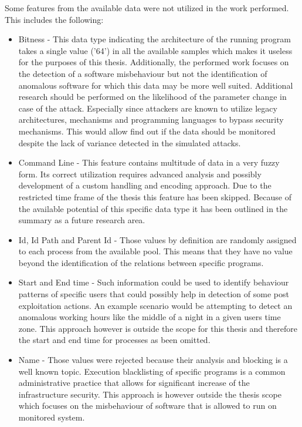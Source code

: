 \documentclass[a4paper,twoside,12pt]{book}
\begin{document}
Some features from the available data were not utilized in the work performed. This includes
the following:
\begin{itemize}
	\item Bitness - This data type indicating the architecture of the running program takes a single value ('64')
	in all the available samples which makes it useless for the purposes of this thesis. Additionally, the performed
	work focuses on the detection of a software misbehaviour but not the identification of anomalous software 
	for which this data may be more well suited. Additional research should be performed on the likelihood of the
	parameter change in case of the attack. Especially since attackers are known to utilize legacy architectures, mechanisms and 
	programming languages to bypass security mechanisms. This would allow find out if the data should be monitored despite
	the lack of variance detected in the simulated attacks.
	\item Command Line -  This feature contains multitude of data in a very fuzzy form. Its correct utilization
	requires advanced analysis and possibly development of a custom handling and encoding approach. Due 
	to the restricted time frame of the thesis this feature has been skipped. Because of the available potential
	of this specific data type it has been outlined in the summary as a future research area.
	\item Id, Id Path and Parent Id - Those values by definition are randomly assigned to each process from the available
	pool. This means that they have no value beyond the identification of the relations between specific programs. 
	\item Start and End time - Such information could be used to identify behaviour patterns of specific users that could possibly help
	in detection of some post exploitation actions. An example scenario would be attempting to detect an anomalous
	working hours like the middle of a night in a given users time zone. This approach however is outside the 
	scope for this thesis and therefore the start and end time for processes as been omitted.
	\item Name - Those values were rejected because their analysis and blocking is a well known topic. Execution 
	blacklisting of specific programs is a common administrative practice that allows for significant increase
	of the infrastructure security. This approach is however outside the thesis scope which focuses on the 
	misbehaviour of software that is allowed to run on monitored system.
\end{itemize}
\end{document}
